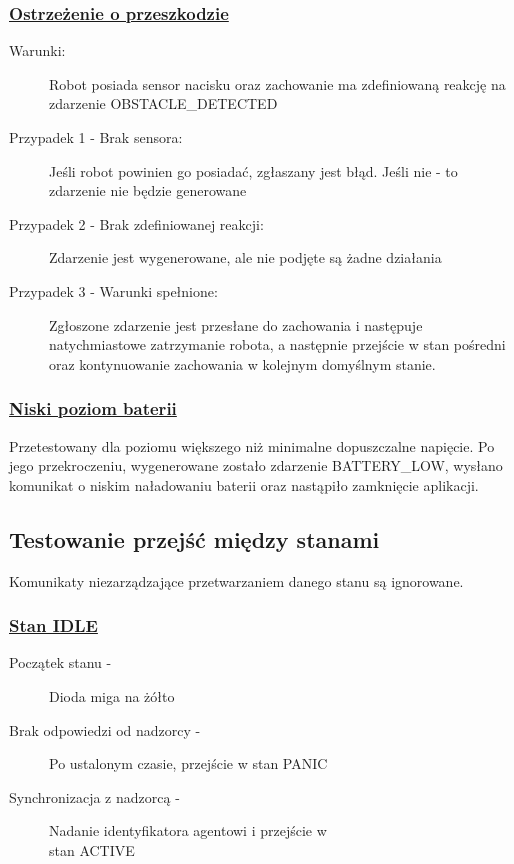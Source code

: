 \subsubsection{\underline{Ostrzeżenie o przeszkodzie}}

\begin{description}
    \item[Warunki:]Robot posiada sensor nacisku oraz zachowanie ma zdefiniowaną reakcję na zdarzenie OBSTACLE\_DETECTED
    \item[Przypadek 1 - Brak sensora:]Jeśli robot powinien go posiadać, zgłaszany jest błąd. Jeśli nie - to zdarzenie nie będzie generowane
    \item[Przypadek 2 - Brak zdefiniowanej reakcji:]Zdarzenie jest wygenerowane, ale nie podjęte są żadne działania
    \item[Przypadek 3 - Warunki spełnione:]Zgłoszone zdarzenie jest przesłane do zachowania i następuje natychmiastowe zatrzymanie robota, a następnie przejście w stan pośredni oraz kontynuowanie zachowania w kolejnym domyślnym stanie.\\
\end{description}

\subsubsection{\underline{Niski poziom baterii}}

Przetestowany dla poziomu większego niż minimalne dopuszczalne napięcie. Po jego przekroczeniu, wygenerowane zostało zdarzenie BATTERY\_LOW, wysłano komunikat o niskim naładowaniu baterii oraz nastąpiło zamknięcie aplikacji.

\subsection{Testowanie przejść między stanami}

Komunikaty niezarządzające przetwarzaniem danego stanu są ignorowane.

\subsubsection{\underline{Stan IDLE}}

\begin{description}
    \item[Początek stanu -]Dioda miga na żółto
    \item[Brak odpowiedzi od nadzorcy -]Po ustalonym czasie, przejście w stan PANIC
    \item[Synchronizacja z nadzorcą -]Nadanie identyfikatora agentowi i przejście w\\stan ACTIVE
\end{description}

